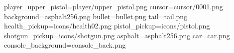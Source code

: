 player_upper_pistol=player/upper_pistol.png
cursor=cursor/0001.png
background=asphalt256.png
bullet=bullet.png
tail=tail.png
health_pickup=icons/health02.png
pistol_pickup=icons/pistol.png
shotgun_pickup=icons/shotgun.png
asphalt=asphalt256.png
car=car.png
console_background=console_back.png
